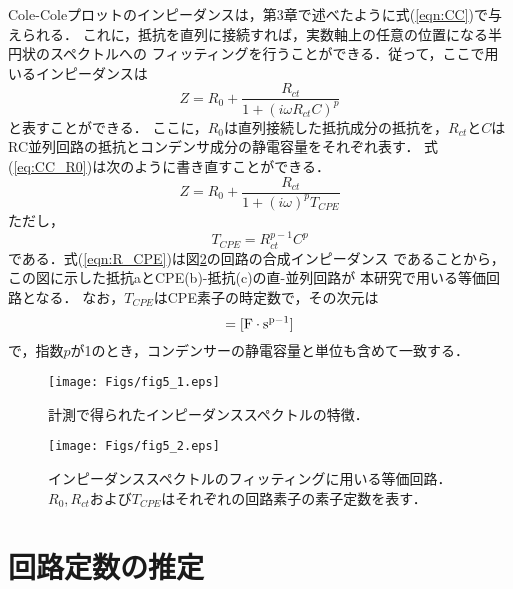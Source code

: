 Cole-Coleプロットのインピーダンスは，第3章で述べたように式(\ref{eqn:CC})で与えられる．
これに，抵抗を直列に接続すれば，実数軸上の任意の位置になる半円状のスペクトルへの
フィッティングを行うことができる．従って，ここで用いるインピーダンスは
\begin{equation}
	Z=R_0 +\frac{R_{ct}}{1+\left( i\omega R_{ct}C\right)^p}
	\label{eqn:CC_R0}
\end{equation}
と表すことができる．
ここに，$R_0$は直列接続した抵抗成分の抵抗を，$R_{ct}$と$C$は
RC並列回路の抵抗とコンデンサ成分の静電容量をそれぞれ表す．
式(\ref{eq:CC_R0})は次のように書き直すことができる．
\begin{equation}
	Z=R_0 +\frac{R_{ct}}{1+\left( i\omega \right)^pT_{CPE}}
	\label{eqn:R_CPE}
\end{equation}
ただし，
\begin{equation}
	T_{CPE}=R_{ct}^{p-1}C^{p}
	\label{eqn:T_CPE}
\end{equation}
である．式(\ref{eqn:R_CPE})は図\ref{fig:fig5_2}の回路の合成インピーダンス
であることから，この図に示した抵抗aとCPE(b)-抵抗(c)の直-並列回路が
本研究で用いる等価回路となる．
なお，$T_{CPE}$はCPE素子の時定数で，その次元は
\begin{equation}
	[T_{CPE}] ={\rm [ F\cdot s^{p-1}]}
	\label{eqn:}
\end{equation}
で，指数$p$が1のとき，コンデンサーの静電容量と単位も含めて一致する．
\begin{figure}[h]
	\begin{center}
	\texttt{[image: Figs/fig5\_1.eps]} 
	\end{center}
	\caption{
		計測で得られたインピーダンススペクトルの特徴．	
	} 
	\label{fig:fig5_1}
\end{figure}
\begin{figure}[h]
	\begin{center}
	\texttt{[image: Figs/fig5\_2.eps]} 
	\end{center}
	\caption{
		インピーダンススペクトルのフィッティングに用いる等価回路．
		$R_0,R_{ct}$および$T_{CPE}$はそれぞれの回路素子の素子定数を表す．
	} 
	\label{fig:fig5_2}
\end{figure}
\section{回路定数の推定}
